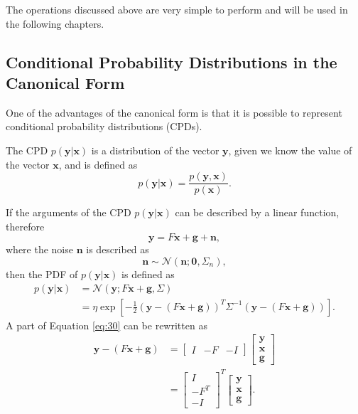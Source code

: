 \documentclass[12pt,oneside,openany,a4paper, %
afrikaans,english,
]{memoir}
\numberwithin{equation}{chapter}
\begin{document}
The operations discussed above are very simple to perform and will be used in the following chapters.
\subsection{Conditional Probability Distributions in the Canonical Form}
One of the advantages of the canonical form is that it is possible to represent conditional probability distributions (CPDs).

The CPD $p(\bm{y}|\bm{x})$ is a distribution of the vector $\bm{y}$, given we know the value of the vector $\bm{x}$, and is defined as
\begin{equation}
p(\bm{y}|\bm{x}) = \frac{p(\bm{y},\bm{x})}{p(\bm{x})}.
\end{equation}

If the arguments of the CPD $p(\bm{y}|\bm{x})$ can be described by a linear function, therefore
\begin{equation}
\bm{y} = F\bm{x} + \bm{g} + \bm{n},
\end{equation}
where the noise $\bm{n}$ is described as
\begin{equation}
\bm{n} \sim \mathcal{N}(\bm{n}; \bm{0}, \Sigma_n),
\end{equation}
then the PDF of $p(\bm{y}|\bm{x})$ is defined as 
\begin{equation}
\label{eq:30}
\begin{split}
p(\bm{y}|\bm{x}) & = \mathcal{N}(\bm{y}; F\bm{x} + \bm{g}, \Sigma) \\
& = \eta\exp\left[-\frac{1}{2}(\bm{y} - (F\bm{x} + \bm{g}))^T\Sigma^{-1}(\bm{y}-(F\bm{x} + \bm{g}))\right].
\end{split}
\end{equation}
A part of Equation \ref{eq:30} can be rewritten as 
\begin{equation}\label{eq: rewrite}
\begin{split}
\bm{y} - (F\bm{x} + \bm{g}) & =
\begin{bmatrix}
I&-F&-I
\end{bmatrix}
\begin{bmatrix}
\bm{y}\\
\bm{x}\\
\bm{g}
\end{bmatrix}\\
& =
\begin{bmatrix}
I\\-F^T\\-I
\end{bmatrix}^T
\begin{bmatrix}
\bm{y}\\
\bm{x}\\
\bm{g}
\end{bmatrix}.
\end{split}
\end{equation}
\end{document}
